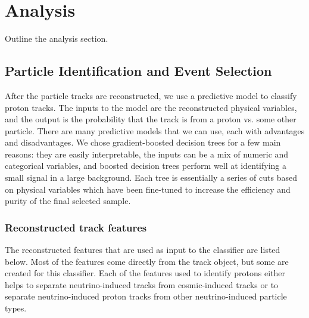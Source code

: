 \section{Analysis}\label{analysis}
\hspace{\parindent}
Outline the analysis section.

\subsection{Particle Identification and Event Selection}
  After the particle tracks are reconstructed, we use a predictive model to
  classify proton tracks. The inputs to the model are the reconstructed
  physical variables, and the output is the probability that the track is from
  a proton vs. some other particle. There are many predictive models that we
  can use, each with advantages and disadvantages. We chose gradient-boosted
  decision trees for a few main reasons: they are easily interpretable, the
  inputs can be a mix of numeric and categorical variables, and boosted
  decision trees perform well at identifying a small signal in a large
  background.  Each tree is essentially a series of cuts based on physical
  variables which have been fine-tuned to increase the efficiency and purity of
  the final selected sample.
  \subsubsection{Reconstructed track features}
    The reconstructed features that are used as input to the classifier are
    listed below. Most of the features come directly from the track object, but
    some are created for this classifier. Each of the features used to identify
    protons either helps to separate neutrino-induced tracks from
    cosmic-induced tracks or to separate neutrino-induced proton tracks from
    other neutrino-induced particle types.

